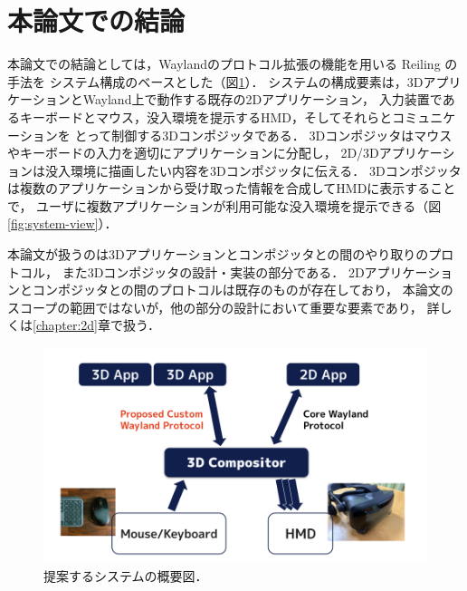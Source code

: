 \section{本論文での結論}
\label{section:overview:conclusion}

本論文での結論としては，Waylandのプロトコル拡張の機能を用いる Reiling の手法を
システム構成のベースとした（図\ref{fig:overview}）．
システムの構成要素は，3DアプリケーションとWayland上で動作する既存の2Dアプリケーション，
入力装置であるキーボードとマウス，没入環境を提示するHMD，そしてそれらとコミュニケーションを
とって制御する3Dコンポジッタである．
3Dコンポジッタはマウスやキーボードの入力を適切にアプリケーションに分配し，
2D/3Dアプリケーションは没入環境に描画したい内容を3Dコンポジッタに伝える．
3Dコンポジッタは複数のアプリケーションから受け取った情報を合成してHMDに表示することで，
ユーザに複数アプリケーションが利用可能な没入環境を提示できる（図\ref{fig:system-view}）．


本論文が扱うのは3Dアプリケーションとコンポジッタとの間のやり取りのプロトコル，
また3Dコンポジッタの設計・実装の部分である．
2Dアプリケーションとコンポジッタとの間のプロトコルは既存のものが存在しており，
本論文のスコープの範囲ではないが，他の部分の設計において重要な要素であり，
詳しくは\ref{chapter:2d}章で扱う．

\begin{figure}[htbp]
  \centering
  \includegraphics[keepaspectratio, width=\linewidth]{figures/overview.png}
  \caption{提案するシステムの概要図．}
  \label{fig:overview}
\end{figure}


